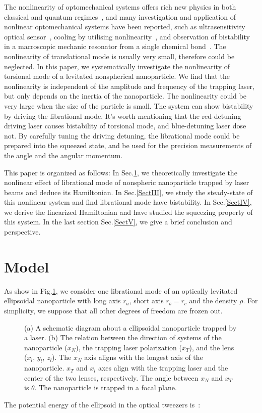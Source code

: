 \documentclass[pra,aps,superscriptaddress,showpacs,preprint]{revtex4}%
\begin{document}
The nonlinearity of optomechanical systems offers rich new physics in both classical and quantum regimes~\cite{GieselerNphys2013,GieselerPrl2013,BrawleyNc2016,Lv2015,LiaoPra2013,ZhuPra2016,GrimsmoJop2013}, and many investigation and application of nonlinear optomechanical systems have been reported, such as ultrasensitivity optical sensor~\cite{FanOe2015}, cooling by utilising nonlinearity~\cite{FonsecaPrl2016}, and observation of bistability in a macroscopic mechanic resonator from a single chemical bond~\cite{HuangNc2016}. The nonlinearity of translational mode is usually very small, therefore could be neglected. In this paper, we systematically investigate the nonlinearity of torsional mode of a levitated nonspherical nanoparticle. We find that the nonlinearity is independent of the amplitude and frequency of the trapping laser, but only depends on the inertia of the nanoparticle. The nonlinearity could be very large when the size of the particle is small. The system can show bistability by driving the librational mode. It's worth mentioning that the red-detuning driving laser causes bistability of torsional mode, and blue-detuning laser dose not. By carefully tuning the driving detuning, the librational mode could be prepared into the squeezed state, and be used for the precision measurements of the angle and the angular momentum.


This paper is organized as follows: In Sec.\ref{SectII}, we  theoretically investigate the nonlinear effect of librational mode of nonspheric nanoparticle trapped by laser beams and deduce its Hamiltonian. In Sec.\ref{SectIII}, we study the steady-state of this nonlinear system and find librational mode have bistability. In Sec.\ref{SectIV}, we derive the linearized Hamiltonian and have studied the squeezing property of this system. In the last section Sec.\ref{SectV}, we give a brief conclusion and perspective.

\section{Model}
\label{SectII}
As show in Fig.\ref{fig:experiment}, we consider one librational mode of an optically levitated ellipsoidal nanoparticle with long axis $r_{a}$, short axis $r_{b}=r_{c}$ and the density $\rho$. For simplicity, we suppose that all other degrees of freedom are frozen out.
\begin{figure}
\centering
{}
\caption{(a) A schematic diagram about a ellipsoidal nanoparticle trapped by a laser. (b) The relation between the direction of
systems of the nanoparticle ($x_N$), the trapping laser polarization ($x_T$), and the lens ($x_l$, $y_l$, $z_l$). The $x_N$ axis aligns with
the longest axis of the nanoparticle. $x_T$ and $x_l$ axes align with the trapping laser and the center of the two lenses,
respectively. The angle between $x_N$ and $x_T$ is $\theta$. The nanoparticle is trapped in a focal plane.}
\label{fig:experiment}
\end{figure}
The potential energy of the ellipsoid in the optical tweezers is~\cite{HoangPrl2016}:
\end{document}

